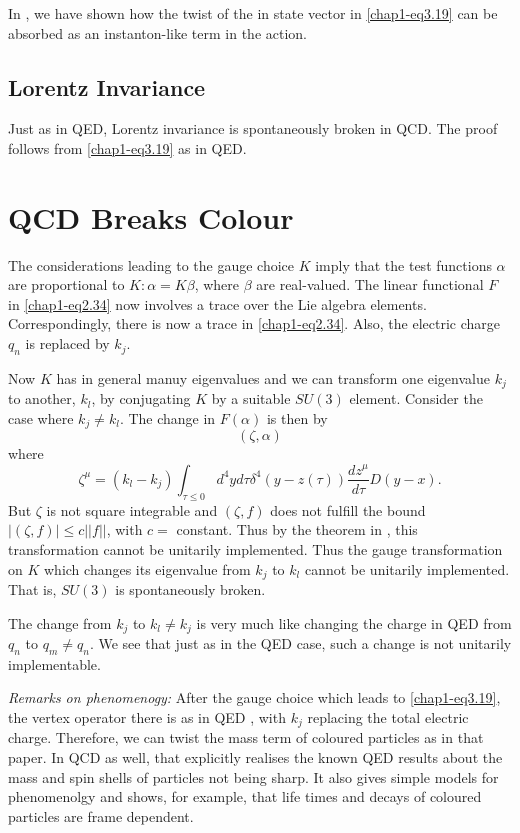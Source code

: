 In \cite{key4}, we have shown how the twist of the in state vector in \eqref{chap1-eq3.19} can be absorbed as an instanton-like term in the action.

\subsection{Lorentz Invariance}\label{chap1-sec3.2}

Just as in QED, Lorentz invariance is spontaneously broken in QCD. The proof follows from \eqref{chap1-eq3.19} as in QED.

\section{QCD Breaks Colour}\label{chap1-sec4}

The considerations leading to the gauge choice $K$ imply that the test functions $\alpha$ are proportional to $K: \alpha = K \beta$, where $\beta$ are real-valued. The linear functional $F$ in \eqref{chap1-eq2.34} now involves a trace over the Lie algebra elements. Correspondingly, there is now a trace in \eqref{chap1-eq2.34}. Also, the electric charge $q_n$ is replaced by $k_j$.

Now $K$ has in general manuy eigenvalues and we can transform one eigenvalue $k_j$ to another, $k_l$, by conjugating $K$ by a suitable $SU(3)$ element. Consider the case where $k_j \neq k_l$. The change in $F(\alpha)$ is then by
\begin{equation}
(\zeta, \alpha) \label{chap1-eq4.1}
\end{equation}
where
\begin{equation}
  \zeta^\mu = (k_l - k_j) \int_{\tau \leq 0} d^4 y d\tau \delta^4 (y -z(\tau)) \frac{dz^\mu}{d \tau} D (y-x). \label{chap1-eq4.2}
\end{equation}
But $\zeta$ is not square integrable and $(\zeta, f)$ does not fulfill the bound $|(\zeta, f)|\leq c || f ||$, with $c=$ constant. Thus by the theorem in \cite{key6}, this transformation cannot be unitarily implemented. Thus the gauge transformation on $K$ which changes its eigenvalue from $k_j$ to $k_l$ cannot be unitarily implemented. That is, $SU(3)$ is spontaneously broken.

The change from $k_j$ to $k_l \neq k_j$ is very much like changing the charge in QED from $q_n$ to $q_m \neq q_n$. We see that just as in the QED case, such a change is not unitarily implementable.

\textit{Remarks on phenomenogy:} After the gauge choice which leads to \eqref{chap1-eq3.19}, the vertex operator there is as in QED \cite{key4}, with $k_j$ replacing the total electric charge. Therefore, we can twist the mass term of coloured particles as in that paper. In QCD as well, that explicitly realises the known QED results \cite{key2, key3} about the mass and spin shells of particles not being sharp. It also gives simple models for phenomenolgy and shows, for example, that life times and decays of coloured particles are frame dependent.

